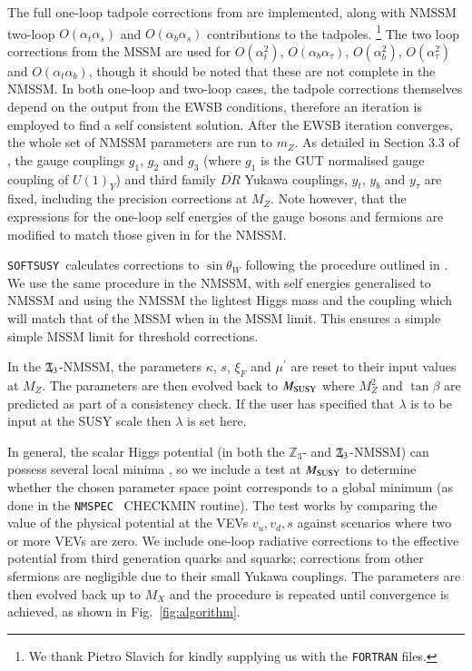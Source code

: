 \documentclass[final,3p,times,pdflatex]{elsarticle}
\def\SOFTSUSY{{\tt SOFTSUSY}}
\newcommand{\Zv}{\,\mathbf{\backslash}\mkern-11.0mu{\mathbb{Z}}_{3}} %
\def\at{\alpha_t}
\def\ab{\alpha_b}
\def\as{\alpha_s}
\def\atau{\alpha_{\tau}}
\def\oatab{O(\at\ab)}
\def\oatas{O(\at\as)}
\def\oabas{O(\ab\as)}
\def\oatq{O(\at^2)}
\def\oabq{O(\ab^2)}
\def\oatauq{O(\atau^2)}
\def\oabatau{O(\ab \atau)}
\begin{document}
The full one-loop tadpole corrections
 from \cite{Degrassi:2009yq} are implemented, along with NMSSM two-loop 
$\oatas$ and $\oabas$ contributions \cite{Degrassi:2009yq} to the tadpoles.%
\footnote{We thank Pietro Slavich for kindly supplying us with the {\tt FORTRAN}
 files.}
 The two loop corrections from the MSSM are used for $\oatq$, $\oabatau$, 
$\oabq$, $\oatauq$ and $\oatab$, though it should be noted that these are not
complete in the NMSSM.  In both one-loop and two-loop cases, the tadpole 
corrections themselves depend on the output from the EWSB conditions, therefore 
an iteration is employed to find a self consistent solution.
After the EWSB iteration converges, the whole set of NMSSM parameters are run to
 $m_Z$. As detailed in Section 3.3 of \cite{Allanach:2001kg}, the gauge 
couplings $g_1$, $g_2$ and $g_3$ (where $g_1$ is the GUT normalised gauge 
coupling of $U(1)_Y$) and third family $\overline{DR}$ Yukawa couplings, $y_t$, 
$y_b$ and $y_\tau$ are fixed, including the precision corrections at $M_Z$.  Note
 however, that the expressions for the one-loop self energies of the gauge 
bosons and fermions are modified to match those given in \cite{Degrassi:2009yq}
 for the NMSSM.

\SOFTSUSY~calculates corrections to $\sin \theta_W$ following the procedure outlined in \cite{Pierce:1997zz}.  We use the same procedure in the NMSSM, with self energies generalised to NMSSM and using the NMSSM the lightest Higgs mass and the coupling which will match that of the MSSM when in the MSSM limit.  This ensures a simple simple MSSM limit for threshold corrections. 

In the $\Zv$-NMSSM, the parameters $\kappa$, $s$, $\xi_F$ and $\mu^\prime$ are 
reset to their input values at $M_Z$.  The parameters are then evolved back to 
$M_{\rm SUSY}$ where $M_Z^2$ and $\tan\beta$ are predicted as part of a consistency 
check.  If the user has specified that $\lambda$ is to be input at the SUSY 
scale then $\lambda$ is set here.  

In general, the scalar Higgs potential (in both the $\mathbb{Z}_3$- and 
$\Zv$-NMSSM) can possess several local minima \cite{Ellwanger:2009dp}, so we 
include a test at $M_{\rm SUSY}$ to determine whether the chosen parameter space 
point corresponds to a global minimum (as done in the {\tt NMSPEC}~\cite{Ellwanger:2006rn} CHECKMIN
 routine).  The test works by comparing the value of the physical potential at 
the VEVs $v_u,v_d,s$ against scenarios where two or more VEVs are zero.  We 
include one-loop radiative corrections to the effective potential from third 
generation quarks and squarks; corrections from other sfermions are negligible 
due to their small Yukawa couplings.   
The parameters are then evolved back up to $M_X$ and the procedure is repeated until convergence is achieved, as shown in Fig.~\ref{fig:algorithm}. 
\end{document}
